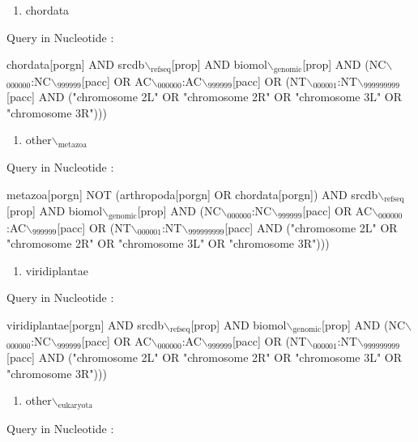 \documentclass[11pt]{article}
\begin{document}
\begin{enumerate}
\begin{enumerate}
\item chordata
\end{enumerate}

Query in Nucleotide :

chordata[porgn] AND srcdb$\backslash$\(_{\text{refseq}}\)[prop] AND biomol$\backslash$\(_{\text{genomic}}\)[prop] AND
(NC$\backslash$\(_{\text{000000}}\):NC$\backslash$\(_{\text{999999}}\)[pacc] OR AC$\backslash$\(_{\text{000000}}\):AC$\backslash$\(_{\text{999999}}\)[pacc] OR
(NT$\backslash$\(_{\text{000001}}\):NT$\backslash$\(_{\text{999999999}}\)[pacc] AND ("chromosome 2L" OR "chromosome 2R"
OR "chromosome 3L" OR "chromosome 3R")))

\begin{enumerate}
\item other$\backslash$\(_{\text{metazoa}}\)
\end{enumerate}

Query in Nucleotide :

metazoa[porgn] NOT (arthropoda[porgn] OR chordata[porgn]) AND
srcdb$\backslash$\(_{\text{refseq}}\)[prop] AND biomol$\backslash$\(_{\text{genomic}}\)[prop] AND
(NC$\backslash$\(_{\text{000000}}\):NC$\backslash$\(_{\text{999999}}\)[pacc] OR AC$\backslash$\(_{\text{000000}}\):AC$\backslash$\(_{\text{999999}}\)[pacc] OR
(NT$\backslash$\(_{\text{000001}}\):NT$\backslash$\(_{\text{999999999}}\)[pacc] AND ("chromosome 2L" OR "chromosome 2R"
OR "chromosome 3L" OR "chromosome 3R")))

\begin{enumerate}
\item viridiplantae
\end{enumerate}

Query in Nucleotide :

viridiplantae[porgn] AND srcdb$\backslash$\(_{\text{refseq}}\)[prop] AND biomol$\backslash$\(_{\text{genomic}}\)[prop]
AND (NC$\backslash$\(_{\text{000000}}\):NC$\backslash$\(_{\text{999999}}\)[pacc] OR AC$\backslash$\(_{\text{000000}}\):AC$\backslash$\(_{\text{999999}}\)[pacc] OR
(NT$\backslash$\(_{\text{000001}}\):NT$\backslash$\(_{\text{999999999}}\)[pacc] AND ("chromosome 2L" OR "chromosome 2R"
OR "chromosome 3L" OR "chromosome 3R")))

\begin{enumerate}
\item other$\backslash$\(_{\text{eukaryota}}\)
\end{enumerate}

Query in Nucleotide :


\end{enumerate}
\end{document}
